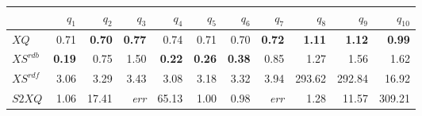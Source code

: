 \begin{tabular}{lrrrrrrrrrr}
\toprule
  & $q_{1}$ & $q_{2}$ & $q_{3}$ & $q_{4}$ & $q_{5}$ & $q_{6}$ & $q_{7}$ & $q_{8}$ & $q_{9}$ & $q_{10}$ \\
\midrule
$\mathit{XQ}$        & 0.71   & \textbf{0.70}  & \textbf{0.77}  & 0.74   & 0.71   & 0.70   & \textbf{0.72}  & \textbf{1.11}  & \textbf{1.12}  & \textbf{0.99}  \\[0.15em]
$\mathit{XS^{rdb}}$  & \textbf{0.19}  & 0.75   & 1.50   & \textbf{0.22}  & \textbf{0.26}  & \textbf{0.38}  & 0.85   & 1.27   & 1.56   & 1.62   \\[0.15em]
$\mathit{XS^{rdf}}$  & 3.06   & 3.29   & 3.43   & 3.08   & 3.18   & 3.32   & 3.94   & 293.62   & 292.84   & 16.92   \\[0.15em]
$\mathit{S2XQ}$      & 1.06   & 17.41   & \textit{err} & 65.13   & 1.00   & 0.98   & \textit{err} & 1.28   & 11.57   & 309.21   \\[0.15em]
\bottomrule
\end{tabular}
